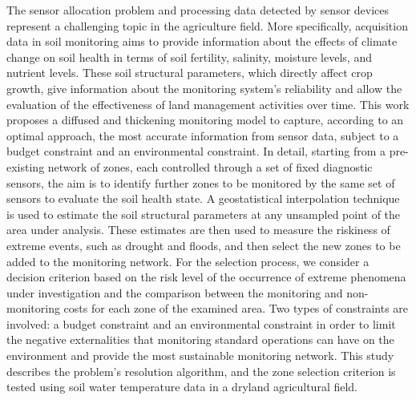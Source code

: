 
\begin{Abstrakt}
    The sensor allocation problem and processing data detected by sensor devices represent a challenging topic in the agriculture field. More specifically, acquisition data in soil monitoring aims to provide information about the effects of climate change on soil health in terms of soil fertility, salinity, moisture levels, and nutrient levels. These soil structural parameters, which directly affect crop growth, give information about the monitoring system's reliability and allow the evaluation of the effectiveness of land management activities over time. This work proposes a diffused and thickening monitoring model to capture, according to an optimal approach, the most accurate information from sensor data, subject to a budget constraint and an environmental constraint. In detail, starting from a pre-existing network of zones, each controlled through a set of fixed diagnostic sensors, the aim is to identify further zones to be monitored by the same set of sensors to evaluate the soil health state. A geostatistical interpolation technique is used to estimate the soil structural parameters at any unsampled point of the area under analysis. These estimates are then used to measure the riskiness of extreme events, such as drought and floods, and then select the new zones to be added to the monitoring network. For the selection process, we consider a decision criterion based on the risk level of the occurrence of extreme phenomena under investigation and the comparison between the monitoring and non-monitoring costs for each zone of the examined area. Two types of constraints are involved: a budget constraint and an environmental constraint in order to limit the negative externalities that monitoring standard operations can have on the environment and provide the most sustainable monitoring network. This study describes the problem's resolution algorithm, and the zone selection criterion is tested using soil water temperature data in a dryland agricultural field.
\end{Abstrakt}



\clearpage
